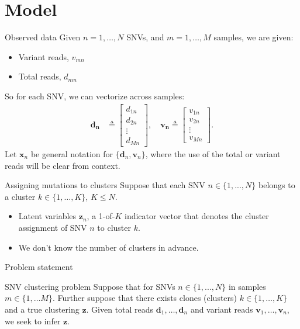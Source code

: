 \documentclass{beamer}
\newcommand{\bx}{\ensuremath{\mathbf{x}}}
\newcommand{\bz}{\ensuremath{\mathbf{z}}}
\begin{document}
\section{Model}
\begin{frame}{Observed data}
Given $n=1,\ldots, N$ SNVs, and $m=1,\ldots,M$ samples, we are given:
\begin{itemize}
	\pause
	\item Variant reads, $v_{mn}$ \pause
	\item Total reads, $d_{mn}$
\end{itemize}
\bigskip
\pause So for each SNV, we can vectorize across samples: \pause
\begin{align*}
\bm{d_{n}} &\triangleq 	\begin{bmatrix} d_{1n} \\ d_{2n} \\ \vdots \\ d_{Mn} \end{bmatrix}, \quad\bm{v_{n}} \triangleq 	\begin{bmatrix} v_{1n} \\ v_{2n} \\ \vdots \\ v_{Mn} \end{bmatrix}.
\end{align*}
\pause
Let $\bx_{n}$ be general notation for $\{\bm{d}_{n}, \bm{v}_{n}\}$, where the use of the total or variant reads will be clear from context.
\end{frame}

\begin{frame}{Assigning mutations to clusters}
Suppose that each SNV $n \in \{1, ..., N\}$ belongs to a cluster $k\in\{1,\ldots,K\}$, $K \leq N$.
\pause
\begin{itemize}
	\item<2-> Latent variables $\bz_n$, a 1-of-$K$ indicator vector that denotes the cluster assignment of SNV $n$ to cluster $k$. 
	\item<3-> We don't know the number of clusters in advance.
\end{itemize}
\end{frame}

\begin{frame}{Problem statement}
\begin{block}{SNV clustering problem}
Suppose that for SNVs $n \in \{1, ..., N\}$ in samples $m\in\{1, \ldots M\}$. Further suppose that there exists clones (clusters) $k\in\{1,\ldots,K\}$ and a true clustering $\bz$. Given total reads $\bm{d}_1, \ldots, \bm{d}_n$ and variant reads $\bm{v}_1, \ldots, \bm{v}_n$, we seek to infer $\bm{z}$.
\end{block}
\end{frame}
\end{document}
